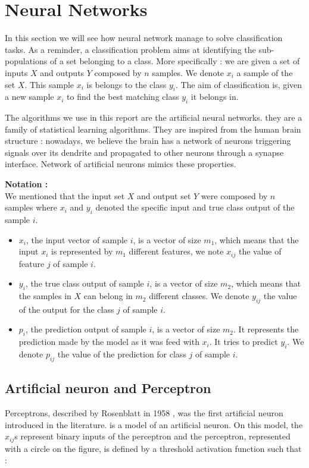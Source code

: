 
\section{Neural Networks}
\label{sec:neural_networks}
	
	In this section we will see how neural network manage to solve classification tasks. As a reminder, a classification problem aims at identifying the sub-populations of a set belonging to a class. More specifically : we are given a set of inputs $X$ and outputs $Y$ composed by $n$ samples. We denote $x_i$ a sample of the set $X$. This sample $x_i$ is belongs to the class $y_i$. The aim of classification is, given a new sample $x_i$ to find the best matching class $y_i$ it belongs in.

	The algorithms we use in this report are the artificial neural networks. they are a family of statistical learning algorithms. They are inspired from the human brain structure : nowadays, we believe the brain has a network of neurons triggering signals over its dendrite and propagated to other neurons through a synapse interface. Network of artificial neurons mimics these properties.

	\vspace{1em}
	\textbf{Notation : }\\
	We mentioned that the input set $X$ and output set $Y$ were composed by $n$ samples where $x_i$ and $y_i$ denoted the specific input and true class output of the sample $i$. 
	\begin{itemize}
		\item $x_i$, the input vector of sample $i$, is a vector of size $m_1$, which means that the input $x_i$ is represented by $m_1$ different features, we note $x_{ij}$ the value of feature $j$ of sample $i$.
		\item $y_i$, the true class output of sample $i$, is a vector of size $m_2$, which means that the samples in $X$ can belong in $m_2$ different classes. We denote $y_{ij}$ the value of the output for the class $j$ of sample $i$.
		\item $p_i$, the prediction output of sample $i$, is a vector of size $m_2$. It represents the prediction made by the model as it was feed with $x_i$. It tries to predict $y_i$. We denote $p_{ij}$ the value of the prediction for class $j$ of sample $i$.
	\end{itemize} 


	\subsection{Artificial neuron and Perceptron}
	\label{sec:Artificial_neurons}
		Perceptrons, described by Rosenblatt in 1958 \cite{rosenblatt1958perceptron}, was the first artificial neuron introduced in the literature.  is a model of an artificial neuron. On this model, the $x_{ij}$s represent binary inputs of the perceptron and the perceptron, represented with a circle on the figure, is defined by a threshold activation function such that :

